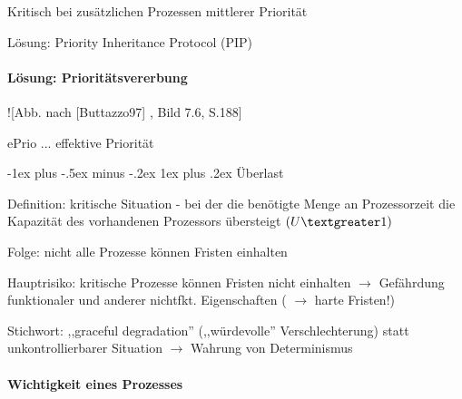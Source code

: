\documentclass[a4paper]{article}
\makeatletter
\renewcommand{\subsubsection}{\@startsection{subsubsection}{3}{0mm}%
 {-1ex plus -.5ex minus -.2ex}%
 {1ex plus .2ex}%
 {\normalfont\small\bfseries}}
\makeatother
\begin{document}
\begin{multicols}{3}
    \begin{itemize*}
        \item
        Kritisch bei zusätzlichen Prozessen mittlerer Priorität
        \item
        Lösung: Priority Inheritance Protocol (PIP)
    \end{itemize*}


    \paragraph{Lösung:
        Prioritätsvererbung}

    \begin{itemize*}
        \item
        ![Abb. nach [Buttazzo97] , Bild 7.6, S.188]
        \item
        ePrio ... effektive Priorität
    \end{itemize*}


    \subsubsection{Überlast}

    \begin{itemize*}
        \item
        Definition: kritische Situation - bei der die benötigte Menge an
        Prozessorzeit die Kapazität des vorhandenen Prozessors übersteigt
        $(U\textgreater1)$
        \begin{itemize*}
            \item Folge: nicht alle Prozesse können Fristen einhalten
        \end{itemize*}
        \item
        Hauptrisiko: kritische Prozesse können Fristen nicht einhalten
        $\rightarrow$ Gefährdung funktionaler und anderer
        nichtfkt. Eigenschaften ( $\rightarrow$ harte Fristen!)
        \item
        Stichwort: ,,graceful degradation'' (,,würdevolle'' Verschlechterung)
        statt unkontrollierbarer Situation $\rightarrow$
        Wahrung von Determinismus
    \end{itemize*}


    \paragraph{Wichtigkeit eines
        Prozesses}


\end{multicols}
\end{document}
